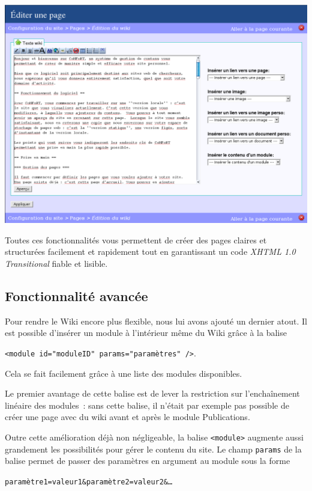 \documentclass[final,11pt,a4paper,twoside,titlepage]{article}
\newcommand{\p}{\vspace{0.3em}}
\newcommand{\code}[1]{\texttt{#1}}
\begin{document}
{      \vspace{1em}
      \begin{center}
      \includegraphics[width=16cm]{admin_wiki.png}
      \end{center}
      \vspace{1em}

      Toutes ces fonctionnalités vous permettent de créer des pages claires et
      structurées facilement et rapidement tout en garantissant un code
      \emph{XHTML 1.0 Transitional} fiable et lisible.

    \subsection{Fonctionnalité avancée}
      Pour rendre le Wiki encore plus flexible, nous lui avons ajouté un dernier
      atout. Il est possible d'insérer un module à l'intérieur même du Wiki
      grâce à la balise
      \begin{center}
      \code{<module id="moduleID" params="paramètres" />}.
      \end{center}
      Cela se fait facilement grâce à une liste des modules disponibles.\p

      Le premier avantage de cette balise est de lever la restriction sur
      l'enchaînement linéaire des modules~: sans cette balise, il n'était par
      exemple pas possible de créer une page avec du wiki avant et après le
      module Publications.\p

      Outre cette amélioration déjà non négligeable, la balise \code{<module>}
      augmente aussi grandement les possibilités pour gérer le contenu du site.
      Le champ \code{params} de la balise permet de passer des paramètres en
      argument au module sous la forme
      \begin{center}
      \code{paramètre1=valeur1\&paramètre2=valeur2\&\ldots}
      \end{center}\p

}
\end{document}
